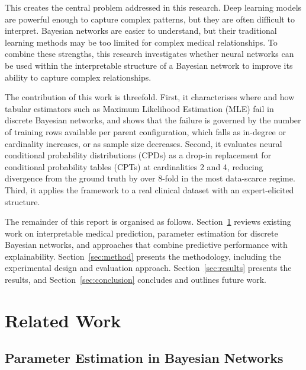\documentclass[a4paper,fleqn]{cas-dc}
\begin{document}
This creates the central problem addressed in this research. Deep learning models are powerful enough to capture complex patterns, but they are often difficult to interpret. Bayesian networks are easier to understand, but their traditional learning methods may be too limited for complex medical relationships. To combine these strengths, this research investigates whether neural networks can be used within the interpretable structure of a Bayesian network to improve its ability to capture complex relationships.

The contribution of this work is threefold. First, it characterises where and how tabular estimators such as Maximum Likelihood Estimation (MLE) fail in discrete Bayesian networks, and shows that the failure is governed by the number of training rows available per parent configuration, which falls as in-degree or cardinality increases, or as sample size decreases. Second, it evaluates neural conditional probability distributions (CPDs) as a drop-in replacement for conditional probability tables (CPTs) at cardinalities 2 and 4, reducing divergence from the ground truth by over 8-fold in the most data-scarce regime. Third, it applies the framework to a real clinical dataset with an expert-elicited structure.

The remainder of this report is organised as follows. Section~\ref{sec:related} reviews existing work on interpretable medical prediction, parameter estimation for discrete Bayesian networks, and approaches that combine predictive performance with explainability. Section~\ref{sec:method} presents the methodology, including the experimental design and evaluation approach. Section~\ref{sec:results} presents the results, and Section~\ref{sec:conclusion} concludes and outlines future work.

\section{Related Work}\label{sec:related}

\subsection{Parameter Estimation in Bayesian Networks}
\end{document}
